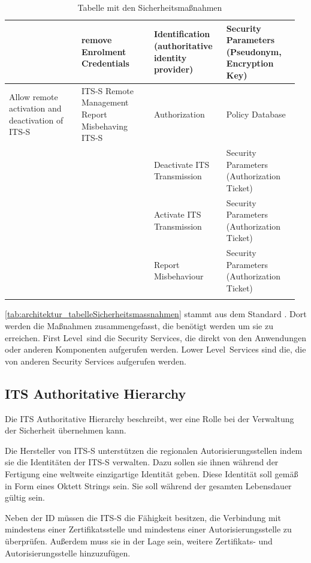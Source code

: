 \begin{longtable}{| p{0.24\linewidth} | p{0.24\linewidth} | p{0.24\linewidth} |p{0.24\linewidth}|}
\cline{2-4}
& remove Enrolment Credentials & Identification (authoritative identity provider) & Security Parameters (Pseudonym, Encryption Key)\\
\hline
Allow remote activation and deactivation of ITS-S & ITS-S Remote Management Report Misbehaving ITS-S & Authorization & Policy Database \\
\cline{3-4}
 & & Deactivate ITS Transmission & Security Parameters (Authorization Ticket) \\
 \cline{3-4}
& &  Activate ITS Transmission & Security Parameters (Authorization Ticket) \\
\cline{3-4}
& & Report Misbehaviour & Security Parameters (Authorization Ticket) \\
\hline 
\caption{Tabelle mit den Sicherheitsmaßnahmen \cite{ts102731}}
\label{tab:architektur_tabelleSicherheitsmassnahmen}
 
 \end{longtable}
\autoref{tab:architektur_tabelleSicherheitsmassnahmen} stammt aus dem Standard \cite{ts102731}. Dort werden die Maßnahmen zusammengefasst, die benötigt werden um sie zu erreichen. \glqq First Level\grqq~sind die Security Services, die direkt von den Anwendungen oder anderen Komponenten aufgerufen werden.  \glqq Lower Level\grqq~Services sind die, die von anderen Security Services aufgerufen werden.



\subsection{ITS Authoritative Hierarchy \label{architektur_itsAuthoriativeHierarchy}}
Die ITS Authoritative Hierarchy beschreibt, wer eine Rolle bei der Verwaltung der Sicherheit übernehmen kann. 

Die Hersteller von \ac{ITS-S} unterstützen die regionalen Autorisierungsstellen indem sie die Identitäten der \ac{ITS-S} verwalten. Dazu sollen sie ihnen während der Fertigung eine weltweite einzigartige Identität geben. Diese Identität soll  gemäß \cite{ts102731} in Form eines Oktett Strings sein. Sie soll während der gesamten Lebensdauer gültig sein.

Neben der \ac{ID} müssen die \ac{ITS-S} die Fähigkeit besitzen, die Verbindung mit mindestens einer Zertifikatsstelle und mindestens einer Autorisierungsstelle zu überprüfen.  Außerdem muss sie in der Lage sein, weitere Zertifikats- und Autorisierungsstelle hinzuzufügen.

